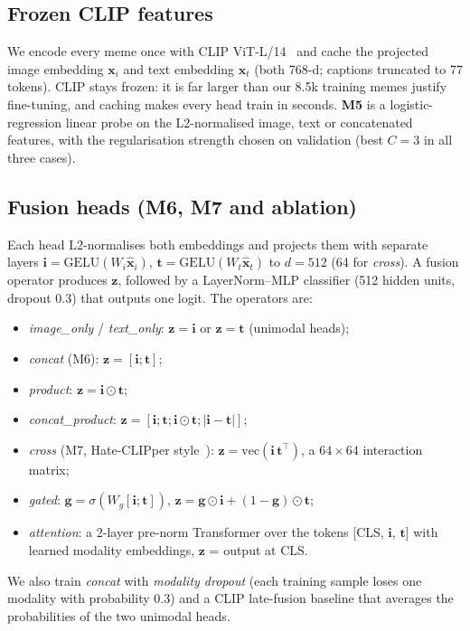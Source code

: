 \documentclass[conference]{IEEEtran}
\begin{document}
\subsection{Frozen CLIP features}
We encode every meme once with CLIP ViT-L/14~\cite{radford2021} and cache the projected image embedding
$\mathbf{x}_i$ and text embedding $\mathbf{x}_t$ (both 768-d; captions truncated to 77 tokens). CLIP stays frozen:
it is far larger than our 8.5k training memes justify fine-tuning, and caching makes every head train in seconds.
\textbf{M5} is a logistic-regression linear probe on the L2-normalised image, text or concatenated features, with the
regularisation strength chosen on validation (best $C=3$ in all three cases).

\subsection{Fusion heads (M6, M7 and ablation)}
Each head L2-normalises both embeddings and projects them with separate layers
$\mathbf{i}=\mathrm{GELU}(W_i\hat{\mathbf{x}}_i)$, $\mathbf{t}=\mathrm{GELU}(W_t\hat{\mathbf{x}}_t)$ to $d=512$
(64 for \emph{cross}). A fusion operator produces $\mathbf{z}$, followed by a LayerNorm--MLP classifier
(512 hidden units, dropout 0.3) that outputs one logit. The operators are:
\begin{itemize}
  \item \emph{image\_only} / \emph{text\_only}: $\mathbf{z}=\mathbf{i}$ or $\mathbf{z}=\mathbf{t}$ (unimodal heads);
  \item \emph{concat} (M6): $\mathbf{z}=[\mathbf{i};\mathbf{t}]$;
  \item \emph{product}: $\mathbf{z}=\mathbf{i}\odot\mathbf{t}$;
  \item \emph{concat\_product}: $\mathbf{z}=[\mathbf{i};\mathbf{t};\mathbf{i}\odot\mathbf{t};|\mathbf{i}-\mathbf{t}|]$;
  \item \emph{cross} (M7, Hate-CLIPper style~\cite{kumar2022}): $\mathbf{z}=\mathrm{vec}(\mathbf{i}\,\mathbf{t}^{\top})$,
        a $64\times64$ interaction matrix;
  \item \emph{gated}: $\mathbf{g}=\sigma(W_g[\mathbf{i};\mathbf{t}])$, $\mathbf{z}=\mathbf{g}\odot\mathbf{i}+(1-\mathbf{g})\odot\mathbf{t}$;
  \item \emph{attention}: a 2-layer pre-norm Transformer over the tokens [CLS, $\mathbf{i}$, $\mathbf{t}$] with learned
        modality embeddings, $\mathbf{z}$ = output at CLS.
\end{itemize}
We also train \emph{concat} with \emph{modality dropout} (each training sample loses one modality with probability
0.3) and a CLIP late-fusion baseline that averages the probabilities of the two unimodal heads.
\end{document}
